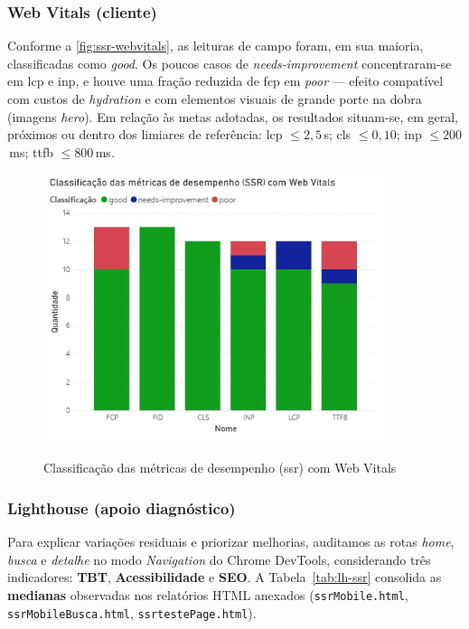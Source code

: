 \subsubsection*{Web Vitals (cliente)}
Conforme a \autoref{fig:ssr-webvitals}, as leituras de campo foram, em sua maioria, classificadas como \textit{good}. Os poucos casos de \textit{needs-improvement} concentraram-se em \acrshort{lcp} e \acrshort{inp}, e houve uma fração reduzida de \acrshort{fcp} em \textit{poor} — efeito compatível com custos de \textit{hydration} e com elementos visuais de grande porte na dobra (imagens \emph{hero}). Em relação às metas adotadas, os resultados situam-se, em geral, próximos ou dentro dos limiares de referência: \acrshort{lcp} $\leq 2{,}5$\,s; \acrshort{cls} $\leq 0{,}10$; \acrshort{inp} $\leq 200$\,ms; \acrshort{ttfb} $\leq 800$\,ms.

\begin{figure}[H]
  \centering
  \caption{Classificação das métricas de desempenho (\acrshort{ssr}) com Web Vitals}
  \includegraphics[width=0.9\textwidth]{media/metricas_ssr_web_vitals.jpeg}
  \label{fig:ssr-webvitals}
\end{figure}

\subsubsection*{Lighthouse (apoio diagnóstico)}
Para explicar variações residuais e priorizar melhorias, auditamos as rotas \emph{home}, \emph{busca} e \emph{detalhe} no modo \emph{Navigation} do Chrome DevTools, considerando três indicadores: \textbf{TBT}, \textbf{Acessibilidade} e \textbf{SEO}.
A Tabela~\ref{tab:lh-ssr} consolida as \textbf{medianas} observadas nos relatórios HTML anexados (\texttt{ssrMobile.html}, \texttt{ssrMobileBusca.html}, \texttt{ssrtestePage.html}).

